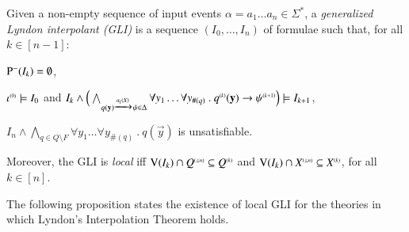\documentclass{llncs}
\begin{document}
\begin{definition}\label{def:generalized-lyndon-interpolant}
  Given a non-empty sequence of input events $\alpha = a_1 \ldots a_n
  \in \Sigma^*$, a \emph{generalized Lyndon interpolant (GLI)} is a
  sequence $(I_0,\ldots,I_n)$ of formulae such that, for all $k \in
  [n-1]$: \begin{compactenum}
    \item $\mathrm{P}^{-}(I_k) = \emptyset$,
    \item ${\iota}^{\scriptscriptstyle{({0})}} \models I_0$ and \(I_k \wedge
      \Big(\bigwedge_{q(\mathbf y) \xrightarrow{{\scriptscriptstyle a_i(X)}}_{{\scriptstyle }} \psi \in \Delta}
      \forall y_1 \ldots \forall y_{\#(q)} ~.~ {q}^{\scriptscriptstyle{({k})}}(\mathbf y)
      \rightarrow {\psi}^{\scriptscriptstyle{({k+1})}}\Big) \models I_{k+1}\),
    \item $I_n \wedge \bigwedge_{q \in Q \setminus F} \forall y_1
      \ldots \forall y_{\#(q)} ~.~ q(\vec{y})$ is unsatisfiable.
  \end{compactenum}
  Moreover, the GLI is \emph{local} iff $\mathrm{V}({I_k}) \cap {Q}^{\scriptscriptstyle{({\leq n})}}
  \subseteq {Q}^{\scriptscriptstyle{({k})}}$ and $\mathrm{V}({I_k}) \cap {X}^{\scriptscriptstyle{({\leq n})}}
  \subseteq {X}^{\scriptscriptstyle{({k})}}$, for all $k \in [n]$.
\end{definition}
The following proposition states the existence of local GLI for the
theories in which Lyndon's Interpolation Theorem holds.
\end{document}
